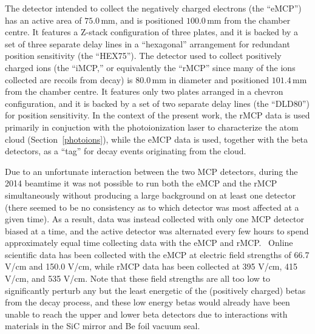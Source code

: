 The detector intended to collect the negatively charged electrons (the ``eMCP'') has an active area of $75.0\,$mm, and is positioned 
$100.0\,$mm from the chamber centre.  It features a Z-stack configuration of three plates, and it is backed by a set of three separate delay lines in a ``hexagonal'' arrangement for redundant position sensitivity (the ``HEX75'').  The detector used to collect positively charged ions (the ``iMCP,'' or equivalently the ``rMCP'' since many of the ions collected are recoils from decay) is $80.0\,$mm in diameter and positioned $101.4\,$mm from the chamber centre.  It features only two plates arranged in a chevron configuration, and it is backed by a set of two separate delay lines (the ``DLD80'') for position sensitivity.  In the context of the present work, the rMCP data is used primarily in conjuction with the photoionization laser to characterize the atom cloud (Section~\ref{photoions}), while the eMCP data is used, together with the beta detectors, as a ``tag'' for decay events originating from the cloud. 

Due to an unfortunate interaction between the two MCP detectors, during the 2014 beamtime it was not possible to run both the eMCP and the rMCP simultaneously without producing a large background on at least one detector (there seemed to be no consistency as to which detector was most affected at a given time).  As a result, data was instead collected with only one MCP detector biased at a time, and the active detector was alternated every few hours to spend approximately equal time collecting data with the eMCP and rMCP.~  Online scientific data has been collected with the eMCP at electric field strengths of 66.7 V/cm and 150.0 V/cm, while rMCP data has been collected at 395 V/cm, 415 V/cm, and 535 V/cm.  Note that these field strengths are all too low to significantly perturb any but the least energetic of the (positively charged) betas from the decay process, and these low energy betas would already have been unable to reach the upper and lower beta detectors due to interactions with materials in the SiC mirror and Be foil vacuum seal.


